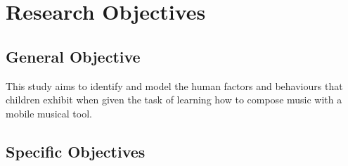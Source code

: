 







\section{Research Objectives}
\label{sec:researchobjectives}

\subsection{General Objective}
\label{sec:generalobjective}


This study aims to identify and model the human factors and behaviours that children exhibit when given the task of learning how to compose music with a mobile musical tool.

\subsection{Specific Objectives}
\label{sec:specificobjectives}

